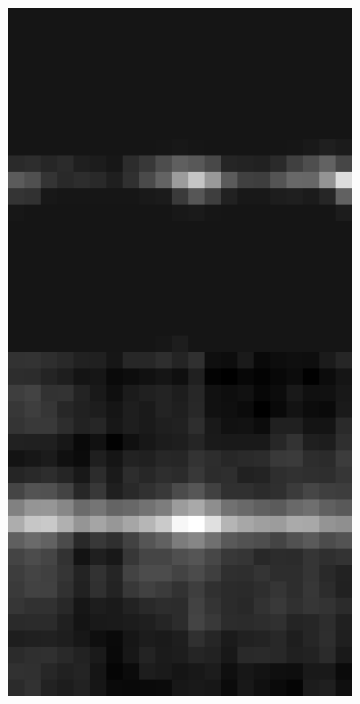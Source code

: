 \documentclass[10pt, letter]{article}
\begin{document}
			\begin{figure}[h!]
				\centering
				\begin{subfigure}[t]{0.1\textwidth}
					\centering
					\includegraphics[width=\textwidth]{figures/inv1}
				\end{subfigure}	

\end{figure}
\end{document}
